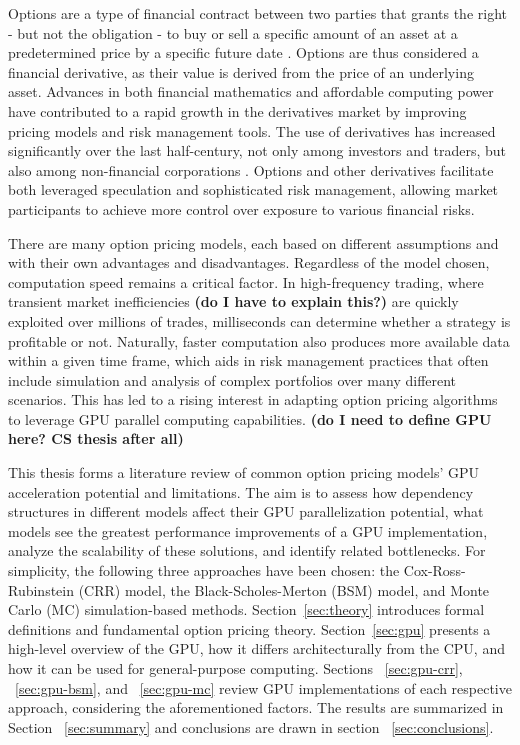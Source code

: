 \documentclass[english,12pt,a4paper,pdftex,sci,utf8]{aaltothesis}
\begin{document}
\thispagestyle{empty}
Options are a type of financial contract between two parties that grants the right - but not the obligation - to buy or sell a specific amount of an asset at a predetermined price by a specific future date \cite{hull2016options}. Options are thus considered a financial derivative, as their value is derived from the price of an underlying asset. Advances in both financial mathematics \cite{merton1994influence} and affordable computing power \cite{nordhaus2007two} have contributed to a rapid growth in the derivatives market by improving pricing models and risk management tools. The use of derivatives has increased significantly over the last half-century, not only among investors and traders, but also among non-financial corporations \cite{bartram2009international}. Options and other derivatives facilitate both leveraged speculation and sophisticated risk management, allowing market participants to achieve more control over exposure to various financial risks.

There are many option pricing models, each based on different assumptions and with their own advantages and disadvantages. Regardless of the model chosen, computation speed remains a critical factor. In high-frequency trading, where transient market inefficiencies \textbf{(do I have to explain this?)} are quickly exploited over millions of trades, milliseconds can determine whether a strategy is profitable or not. Naturally, faster computation also produces more available data within a given time frame, which aids in risk management practices that often include simulation and analysis of complex portfolios over many different scenarios. This has led to a rising interest in adapting option pricing algorithms to leverage GPU parallel computing capabilities. \textbf{(do I need to define GPU here? CS thesis after all)}

This thesis forms a literature review of common option pricing models' GPU acceleration potential and limitations. The aim is to assess how dependency structures in different models affect their GPU parallelization potential, what models see the greatest performance improvements of a GPU implementation, analyze the scalability of these solutions, and identify related bottlenecks. For simplicity, the following three approaches have been chosen: the Cox-Ross-Rubinstein (CRR) model, the Black-Scholes-Merton (BSM) model, and Monte Carlo (MC) simulation-based methods. Section~\ref{sec:theory} introduces formal definitions and fundamental option pricing theory. Section~\ref{sec:gpu} presents a high-level overview of the GPU, how it differs architecturally from the CPU, and how it can be used for general-purpose computing. Sections ~\ref{sec:gpu-crr}, ~\ref{sec:gpu-bsm}, and ~\ref{sec:gpu-mc} review GPU implementations of each respective approach, considering the aforementioned factors. The results are summarized in Section ~\ref{sec:summary} and conclusions are drawn in section ~\ref{sec:conclusions}.
\end{document}
